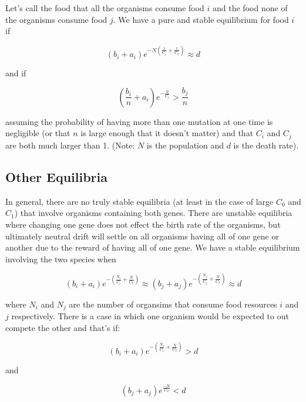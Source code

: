 \documentclass[11pt]{article}
\begin{document}
	Let's call the food that all the organisms consume food $i$ and the food none of the organisms consume food $j$. We have a pure and stable equilibrium for food $i$ if
	
	\begin{equation*}
		(b_i + a_i)e^{-N(\frac{1}{C_i} + \frac{1}{C_2})} \approx d
	\end{equation*}
	
	and if
	
	\begin{equation*}
		(\frac{b_i}{n} + a_i)e^{-\frac{N}{C_i}} > \frac{b_j}{n}
	\end{equation*}
	
	assuming the probability of having more than one mutation at one time is negligible (or that $n$ is large enough that it doesn't matter) and that $C_i$ and $C_j$ are both much larger than 1. (Note: $N$ is the population and $d$ is the death rate).
	
	\subsection*{Other Equilibria}
	
	In general, there are no truly stable equilibria (at least in the case of large $C_0$ and $C_1$) that involve organisms containing both genes. There are unstable equilibria where changing one gene does not effect the birth rate of the organisms, but ultimately neutral drift will settle on all organisms having all of one gene or another due to the reward of having all of one gene. We have a stable equilibrium involving the two species when 
	
	\begin{equation*}
		(b_i + a_i)e^{-(\frac{N_i}{C_i} + \frac{N}{C_2})} \approx (b_j + a_j)e^{-(\frac{N_j}{C_j} + \frac{N}{C_2})} \approx d
	\end{equation*}
	
	where $N_i$ and $N_j$ are the number of organsims that consume food resources $i$ and $j$ respectively. There is a case in which one organism would be expected to out compete the other and that's if:
	
	\begin{equation*}
		(b_i + a_i)e^{-(\frac{N_i}{C_i} + \frac{N}{C_2})} > d
	\end{equation*}
	
	and
	
	\begin{equation*}
		(b_j + a_j)e^{\frac{-N}{C_2}} < d
	\end{equation*}
\end{document}
